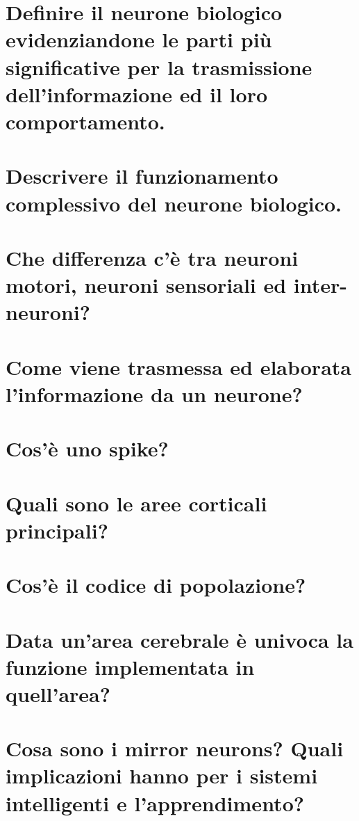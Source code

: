 \documentclass[\main/main.tex]{subfiles}
\begin{document}
\section{Definire il neurone biologico evidenziandone le parti più significative per la trasmissione dell'informazione ed il loro comportamento.}
\section{Descrivere il funzionamento complessivo del neurone biologico.}
\section{Che differenza c'è tra neuroni motori, neuroni sensoriali ed inter-neuroni?}
\section{Come viene trasmessa ed elaborata l'informazione da un neurone?}
\section{ Cos'è uno spike?}
\section{ Quali sono le aree corticali principali?}
\section{Cos'è il codice di popolazione?}
\section{Data un'area cerebrale è univoca la funzione implementata in quell'area?}
\section{Cosa sono i mirror neurons? Quali implicazioni hanno per i sistemi intelligenti e l’apprendimento?}
\end{document}
